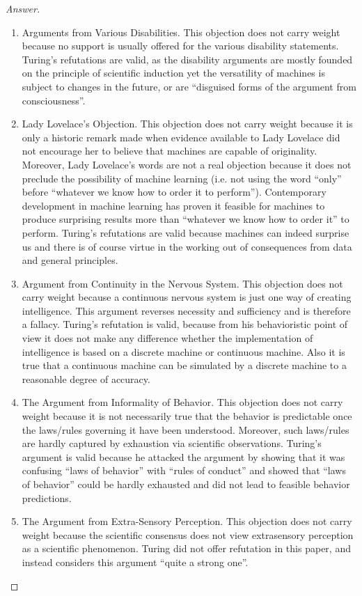 \documentclass{amsbook}
\theoremstyle{definition}
\theoremstyle{remark}
\numberwithin{section}{chapter}
\numberwithin{equation}{chapter}
\begin{document}
\begin{proof}[Answer]
\begin{enumerate}
\item Arguments from Various Disabilities. This objection does not carry weight because no support is usually offered for the various disability statements. Turing's refutations are valid, as the disability arguments are mostly founded on the principle of scientific induction yet the versatility of machines is subject to changes in the future, or are ``disguised forms of the argument from consciousness''.
\item Lady Lovelace's Objection. This objection does not carry weight because it is only a historic remark made when evidence available to Lady Lovelace did not encourage her to believe that machines are capable of originality. Moreover, Lady Lovelace's words are not a real objection because it does not preclude the possibility of machine learning (i.e. not using the word ``only'' before ``whatever we know how to order it to perform''). Contemporary development in machine learning has proven it feasible for machines to produce surprising results more than ``whatever we know how to order it'' to perform. Turing's refutations are valid because machines can indeed surprise us and there is of course virtue in the working out of consequences from data and general principles.
\item Argument from Continuity in the Nervous System. This objection does not carry weight because a continuous nervous system is just one way of creating intelligence. This argument reverses necessity and sufficiency and is therefore a fallacy. Turing's refutation is valid, because from his behavioristic point of view it does not make any difference whether the implementation of intelligence is based on a discrete machine or continuous machine. Also it is true that a continuous machine can be simulated by a discrete machine to a reasonable degree of accuracy.
\item The Argument from Informality of Behavior. This objection does not carry weight because it is not necessarily true that the behavior is predictable once the laws/rules governing it have been understood. Moreover, such laws/rules are hardly captured by exhaustion via scientific observations. Turing's argument is valid because he attacked the argument by showing that it was confusing ``laws of behavior'' with ``rules of conduct'' and showed that ``laws of behavior'' could be hardly exhausted and did not lead to feasible behavior predictions.
\item The Argument from Extra-Sensory Perception. This objection does not carry weight because the scientific consensus does not view extrasensory perception as a scientific phenomenon. Turing did not offer refutation in this paper, and instead considers this argument ``quite a strong one''.
\end{enumerate}


\end{proof}
\end{document}
